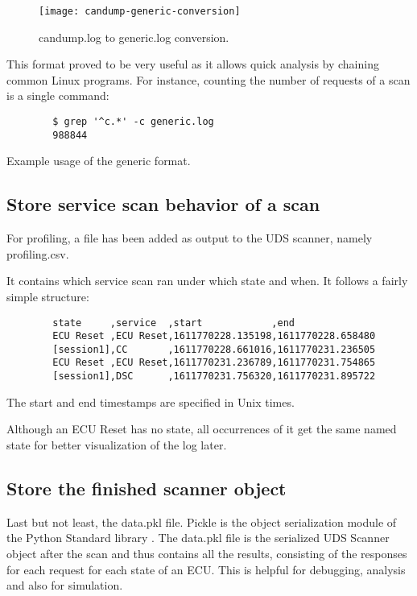 \begin{figure}[h]
    \centering
    \texttt{[image: candump-generic-conversion]}
    \caption{candump.log to generic.log conversion.}
    \label{fig:candump-generic-conversion}
\end{figure}

This format proved to be very useful as it allows quick analysis by chaining common Linux programs.
For instance, counting the number of requests of a scan is a single command:
\begin{listing}[H]
\begin{verbatim}
        $ grep '^c.*' -c generic.log
        988844
\end{verbatim}
\caption{Example usage of the generic format.}
\label{lst:usage-generic}
\end{listing}

\subsection{Store service scan behavior of a scan}

For profiling, a file has been added as output to the UDS scanner, namely profiling.csv.

It contains which service scan ran under which state and when. It follows a fairly simple structure:

\begin{samepage}
    \begin{verbatim}
        state     ,service  ,start            ,end
        ECU Reset ,ECU Reset,1611770228.135198,1611770228.658480
        [session1],CC       ,1611770228.661016,1611770231.236505
        ECU Reset ,ECU Reset,1611770231.236789,1611770231.754865
        [session1],DSC      ,1611770231.756320,1611770231.895722
    \end{verbatim}
\end{samepage}

The start and end timestamps are specified in Unix times.

Although an ECU Reset has no state, all occurrences of it get the same named state for better visualization of the log later.

\subsection{Store the finished scanner object}

Last but not least, the data.pkl file. Pickle is the object serialization module of the Python Standard library \cite{pickle}. The data.pkl file is the serialized UDS Scanner object after the scan and thus contains all the results, consisting of the responses for each request for each state of an ECU. This is helpful for debugging, analysis and also for simulation.


